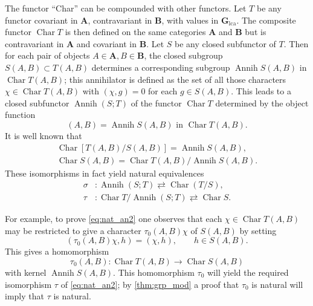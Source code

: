 \documentclass[11pt,a4paper]{report}
\DeclareMathOperator{\chr}{Char}
\DeclareMathOperator{\an}{Annih}
\begin{document}
The functor ``Char'' can be compounded with other functors. Let $T$ be any functor covariant in $\mathbf{A}$,
contravariant in $\mathbf{B}$, with values in $\mathbf{G}_\text{lca}$. The composite functor $\chr T$ is then
defined on the same categories $\mathbf{A}$ and $\mathbf{B}$ but is contravariant in $\mathbf{A}$ and 
covariant in $\mathbf{B}$. Let $S$ be any closed subfunctor of $T$. Then for each pair of objects $A\in\mathbf{A},
B\in\mathbf{B}$, the closed subgroup $S(A,B)\subset T(A,B)$ determines a corresponding subgroup $\an S(A,B)$ in 
$\chr T(A,B)$; this annihilator is defined as the set of all those characters $\chi\in\chr T(A,B)$ with $(\chi,g)=0$
for each $g\in S(A,B)$. This leads to a closed subfunctor $\an(S;T)$ of the functor $\chr T$ determined by the object
function
\begin{equation*}
	[\an(S;T)](A,B)=\an S(A,B)\text{ in } \chr T(A,B).
\end{equation*}
It is well known that
\begin{gather*}
	\chr [T(A,B)/S(A,B)]=\an S(A,B),\\
	\chr S(A,B)=\chr T(A,B)/\an S(A,B).
\end{gather*}
These isomorphisms in fact yield natural equivalences
\begin{align}
	\sigma &: \an(S;T)\rightleftarrows\chr (T/S),\label{eq:nat_an}\\
	\tau &: \chr T/\an (S;T)\rightleftarrows\chr S.\label{eq:nat_an2}
\end{align}

For example, to prove \cref{eq:nat_an2} one observes that each $\chi\in\chr T(A,B)$ may be restricted to give
a character $\tau_0(A,B)\chi$ of $S(A,B)$ by setting
\begin{equation}\label{eq:nat_an3}
	(\tau_0(A,B)\chi,h)= (\chi,h),\qquad h\in S(A,B).
\end{equation}
This gives a homomorphism
\begin{equation*}
	\tau_0(A,B):\chr T(A,B)\rightarrow\chr S(A,B)
\end{equation*}
with kernel $\an S(A,B)$. This homomorphism $\tau_0$ will yield the required isomorphism $\tau$ of \cref{eq:nat_an2};
by \cref{thm:grp_mod} a proof that $\tau_0$ is natural will imply that $\tau$ is natural.
\end{document}
